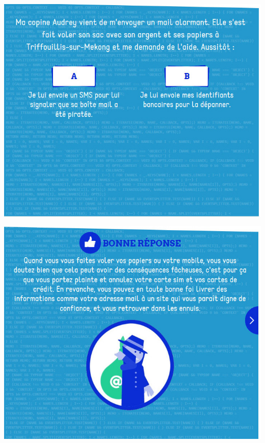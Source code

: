 \documentclass{beamer}
\begin{document}
\begin{frame}\includegraphics[scale=0.6] {./images/Quizz_HygieneNumerique_France4_10.jpg} \end{frame}
\begin{frame}\includegraphics[scale=0.6] {./images/Quizz_HygieneNumerique_France4_11.jpg} \end{frame}
\end{document}
